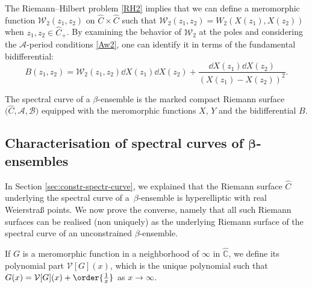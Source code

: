 \documentclass[10pt,a4paper]{amsart}
\numberwithin{equation}{section}
\newcommand{\W}{\mathcal{W}}
\newcommand{\A}{\mathcal{A}}
\begin{document}
The Riemann--Hilbert problem \eqref{RH2} implies that we can define a meromorphic
function $\W_{2}(z_1,z_2)$ on $\widehat{C} \times \widehat{C}$ such that
$\W_{2}(z_1,z_2) = W_{2}(X(z_1),X(z_2))$ when
$z_1,z_2 \in \widehat{C}_{+}$. By examining the behavior of $\W_2$ at the poles and considering the $\A$-period conditions \eqref{Aw2}, one can identify it in terms of the fundamental bidifferential:
\begin{equation}
 \label{BW2}
 B(z_1,z_2) = \W_{2}(z_1,z_2)\dd X(z_1)\dd X(z_2) + \frac{\dd X(z_1)\dd X(z_2)}{(X(z_1) - X(z_2))^{2}}.
\end{equation}

\begin{Definition}
The spectral curve of a $\beta$-ensemble is the marked compact Riemann surface $\big(\widehat{C},\mathcal{A},\mathcal{B}\big)$ equipped with the meromorphic functions $X$, $Y$ and the bidifferential $B$.
\end{Definition}

\subsection[Characterisation of spectral curves of beta-ensembles]{Characterisation of spectral curves of $\boldsymbol{\beta}$-ensembles}

In Section \ref{sec:constr-spectr-curve}, we explained that the Riemann surface $\widehat{C}$ underlying the spectral curve of \mbox{a~$\beta$-ensemble} is hyperelliptic with real Weierstra\ss{} points. We now prove the converse, namely that all such Riemann surfaces can be realised (non uniquely) as the underlying Riemann surface of the spectral curve of an unconstrained $\beta$-ensemble.

 \begin{Definition}
 If $G$ is a meromorphic function in a neighborhood of $\infty$ in $\widehat{\mathbb{C}}$, we define its polynomial part $\mathcal{V}[G](x)$, which is the unique polynomial such that $G(x) = \mathcal{V}[G](x) + \order{\frac{1}{x}}$ as $x \rightarrow \infty$.
 \end{Definition}
\end{document}

